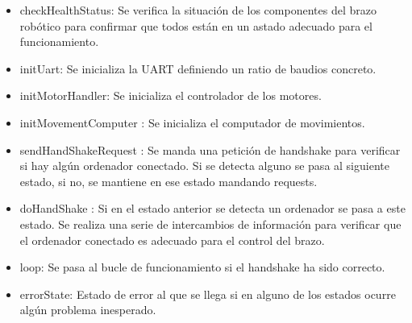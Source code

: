 \begin{itemize}
    \item checkHealthStatus: Se verifica la situación de los componentes del brazo robótico para confirmar que todos están en un astado adecuado para el funcionamiento. 
    \item initUart: Se inicializa la UART definiendo un ratio de baudios concreto.
    \item initMotorHandler: Se inicializa el controlador de los motores.
    \item initMovementComputer : Se inicializa el computador de movimientos.
    \item sendHandShakeRequest : Se manda una petición de handshake para verificar si hay algún ordenador conectado. Si se detecta alguno se pasa al siguiente estado, si no, se mantiene en ese estado mandando requests.
    \item doHandShake : Si en el estado anterior se detecta un ordenador se pasa a este estado. Se realiza una serie de intercambios de información para verificar que el ordenador conectado es adecuado para el control del brazo.
    \item loop: Se pasa al bucle de funcionamiento si el handshake ha sido correcto.
    \item errorState: Estado de error al que se llega si en alguno de los estados ocurre algún problema inesperado. 
    
    
\end{itemize}